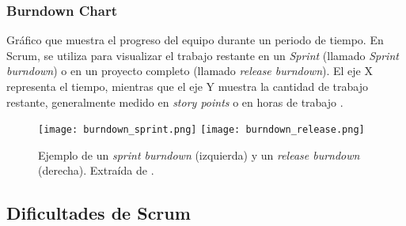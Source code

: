 \subsubsection{Burndown Chart}
\label{sec:burndown_chart}
\par Gráfico que muestra el progreso del equipo durante un periodo de tiempo. En Scrum, se utiliza para visualizar el trabajo restante en un \emph{Sprint} (llamado \textit{Sprint burndown}) o en un proyecto completo (llamado \textit{release burndown}). El eje X representa el tiempo, mientras que el eje Y muestra la cantidad de trabajo restante, generalmente medido en \emph{story points} o en horas de trabajo \cite{montegalianoImplantarScrumCon2016,canosaferreiroSCRUMTeoriaImplementacion2024}. 
%
\begin{figure}[h]
    \centering
    \texttt{[image: burndown\_sprint.png]}
    \texttt{[image: burndown\_release.png]}
    \caption{Ejemplo de un \textit{sprint burndown} (izquierda) y un \textit{release burndown} (derecha). Extraída de \cite{montegalianoImplantarScrumCon2016}.}
    \label{fig:x sprint burndown ejemplo}
\end{figure}
%
%
\subsection{Dificultades de Scrum}
